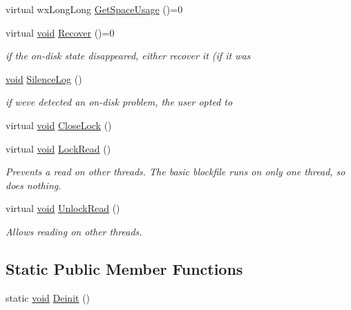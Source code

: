 \begin{DoxyCompactItemize}
virtual wx\+Long\+Long \hyperlink{class_block_file_a8f1eb8b4aecfb5574b9a0054eb431546}{Get\+Space\+Usage} ()=0
\item 
virtual \hyperlink{sound_8c_ae35f5844602719cf66324f4de2a658b3}{void} \hyperlink{class_block_file_ab57c263f507f60b0072390d4e876ea57}{Recover} ()=0
\begin{DoxyCompactList}\small\item\em if the on-\/disk state disappeared, either recover it (if it was \end{DoxyCompactList}\item 
\hyperlink{sound_8c_ae35f5844602719cf66324f4de2a658b3}{void} \hyperlink{class_block_file_a8db50090685c558873cddb71ace1d309}{Silence\+Log} ()
\begin{DoxyCompactList}\small\item\em if we\textquotesingle{}ve detected an on-\/disk problem, the user opted to \end{DoxyCompactList}\item 
virtual \hyperlink{sound_8c_ae35f5844602719cf66324f4de2a658b3}{void} \hyperlink{class_block_file_a4eda965a6ab0b7019b3fe1e12c93e969}{Close\+Lock} ()
\item 
virtual \hyperlink{sound_8c_ae35f5844602719cf66324f4de2a658b3}{void} \hyperlink{class_block_file_ab3d2edb6eb43083e2126c15b1c160d83}{Lock\+Read} ()
\begin{DoxyCompactList}\small\item\em Prevents a read on other threads. The basic blockfile runs on only one thread, so does nothing. \end{DoxyCompactList}\item 
virtual \hyperlink{sound_8c_ae35f5844602719cf66324f4de2a658b3}{void} \hyperlink{class_block_file_aff31d5108eaf81313f3cde9f93704e2d}{Unlock\+Read} ()
\begin{DoxyCompactList}\small\item\em Allows reading on other threads. \end{DoxyCompactList}\end{DoxyCompactItemize}
\subsection*{Static Public Member Functions}
\begin{DoxyCompactItemize}
\item 
static \hyperlink{sound_8c_ae35f5844602719cf66324f4de2a658b3}{void} \hyperlink{class_block_file_a2850975073dae96a78ac8b8e35ac376d}{Deinit} ()
\end{DoxyCompactItemize}
